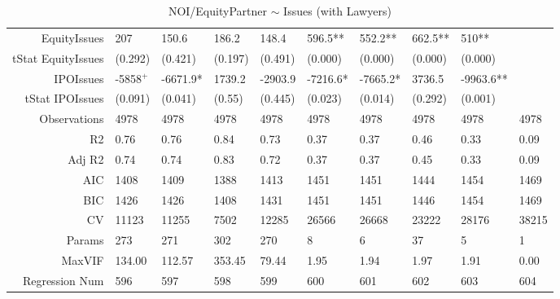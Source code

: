 \begin{table}[ht]
\begin{tabular}{rlllllllll}
  EquityIssues & 207 & 150.6 & 186.2 & 148.4 & 596.5** & 552.2** & 662.5** & 510** &  \\ 
  tStat EquityIssues & (0.292) & (0.421) & (0.197) & (0.491) & (0.000) & (0.000) & (0.000) & (0.000) &  \\ 
  IPOIssues & -5858$^{+}$ & -6671.9* & 1739.2 & -2903.9 & -7216.6* & -7665.2* & 3736.5 & -9963.6** &  \\ 
  tStat IPOIssues & (0.091) & (0.041) & (0.55) & (0.445) & (0.023) & (0.014) & (0.292) & (0.001) &  \\ 
  Observations & 4978 & 4978 & 4978 & 4978 & 4978 & 4978 & 4978 & 4978 & 4978 \\ 
  R2 & 0.76 & 0.76 & 0.84 & 0.73 & 0.37 & 0.37 & 0.46 & 0.33 & 0.09 \\ 
  Adj R2 & 0.74 & 0.74 & 0.83 & 0.72 & 0.37 & 0.37 & 0.45 & 0.33 & 0.09 \\ 
  AIC & 1408 & 1409 & 1388 & 1413 & 1451 & 1451 & 1444 & 1454 & 1469 \\ 
  BIC & 1426 & 1426 & 1408 & 1431 & 1451 & 1451 & 1446 & 1454 & 1469 \\ 
  CV & 11123 & 11255 & 7502 & 12285 & 26566 & 26668 & 23222 & 28176 & 38215 \\ 
  Params & 273 & 271 & 302 & 270 & 8 & 6 & 37 & 5 & 1 \\ 
  MaxVIF & 134.00 & 112.57 & 353.45 & 79.44 & 1.95 & 1.94 & 1.97 & 1.91 & 0.00 \\ 
  Regression Num & 596 & 597 & 598 & 599 & 600 & 601 & 602 & 603 & 604 \\ 
   \hline
\end{tabular}
\caption{NOI/EquityPartner $\sim$ Issues (with Lawyers)} 
\end{table}
